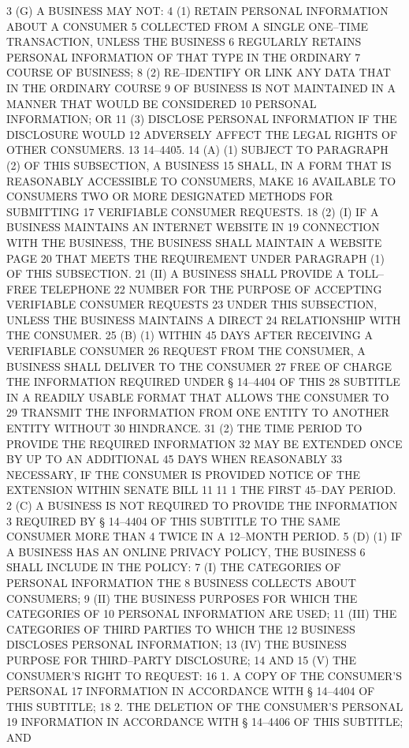 3 (G) A BUSINESS MAY NOT:
4 (1) RETAIN PERSONAL INFORMATION ABOUT A CONSUMER
5 COLLECTED FROM A SINGLE ONE–TIME TRANSACTION, UNLESS THE BUSINESS
6 REGULARLY RETAINS PERSONAL INFORMATION OF THAT TYPE IN THE ORDINARY
7 COURSE OF BUSINESS;
8 (2) RE–IDENTIFY OR LINK ANY DATA THAT IN THE ORDINARY COURSE
9 OF BUSINESS IS NOT MAINTAINED IN A MANNER THAT WOULD BE CONSIDERED
10 PERSONAL INFORMATION; OR
11 (3) DISCLOSE PERSONAL INFORMATION IF THE DISCLOSURE WOULD
12 ADVERSELY AFFECT THE LEGAL RIGHTS OF OTHER CONSUMERS.
13 14–4405.
14 (A) (1) SUBJECT TO PARAGRAPH (2) OF THIS SUBSECTION, A BUSINESS
15 SHALL, IN A FORM THAT IS REASONABLY ACCESSIBLE TO CONSUMERS, MAKE
16 AVAILABLE TO CONSUMERS TWO OR MORE DESIGNATED METHODS FOR SUBMITTING
17 VERIFIABLE CONSUMER REQUESTS.
18 (2) (I) IF A BUSINESS MAINTAINS AN INTERNET WEBSITE IN
19 CONNECTION WITH THE BUSINESS, THE BUSINESS SHALL MAINTAIN A WEBSITE PAGE
20 THAT MEETS THE REQUIREMENT UNDER PARAGRAPH (1) OF THIS SUBSECTION.
21 (II) A BUSINESS SHALL PROVIDE A TOLL–FREE TELEPHONE
22 NUMBER FOR THE PURPOSE OF ACCEPTING VERIFIABLE CONSUMER REQUESTS
23 UNDER THIS SUBSECTION, UNLESS THE BUSINESS MAINTAINS A DIRECT
24 RELATIONSHIP WITH THE CONSUMER.
25 (B) (1) WITHIN 45 DAYS AFTER RECEIVING A VERIFIABLE CONSUMER
26 REQUEST FROM THE CONSUMER, A BUSINESS SHALL DELIVER TO THE CONSUMER
27 FREE OF CHARGE THE INFORMATION REQUIRED UNDER § 14–4404 OF THIS
28 SUBTITLE IN A READILY USABLE FORMAT THAT ALLOWS THE CONSUMER TO
29 TRANSMIT THE INFORMATION FROM ONE ENTITY TO ANOTHER ENTITY WITHOUT
30 HINDRANCE.
31 (2) THE TIME PERIOD TO PROVIDE THE REQUIRED INFORMATION
32 MAY BE EXTENDED ONCE BY UP TO AN ADDITIONAL 45 DAYS WHEN REASONABLY
33 NECESSARY, IF THE CONSUMER IS PROVIDED NOTICE OF THE EXTENSION WITHIN 
SENATE BILL 11 11
1 THE FIRST 45–DAY PERIOD.
2 (C) A BUSINESS IS NOT REQUIRED TO PROVIDE THE INFORMATION
3 REQUIRED BY § 14–4404 OF THIS SUBTITLE TO THE SAME CONSUMER MORE THAN
4 TWICE IN A 12–MONTH PERIOD.
5 (D) (1) IF A BUSINESS HAS AN ONLINE PRIVACY POLICY, THE BUSINESS
6 SHALL INCLUDE IN THE POLICY:
7 (I) THE CATEGORIES OF PERSONAL INFORMATION THE
8 BUSINESS COLLECTS ABOUT CONSUMERS;
9 (II) THE BUSINESS PURPOSES FOR WHICH THE CATEGORIES OF
10 PERSONAL INFORMATION ARE USED;
11 (III) THE CATEGORIES OF THIRD PARTIES TO WHICH THE
12 BUSINESS DISCLOSES PERSONAL INFORMATION;
13 (IV) THE BUSINESS PURPOSE FOR THIRD–PARTY DISCLOSURE;
14 AND
15 (V) THE CONSUMER’S RIGHT TO REQUEST:
16 1. A COPY OF THE CONSUMER’S PERSONAL
17 INFORMATION IN ACCORDANCE WITH § 14–4404 OF THIS SUBTITLE;
18 2. THE DELETION OF THE CONSUMER’S PERSONAL
19 INFORMATION IN ACCORDANCE WITH § 14–4406 OF THIS SUBTITLE; AND
